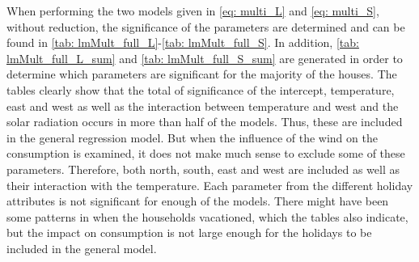 \noindent When performing the two models given in \cref{eq: multi_L} and \cref{eq: multi_S}, without reduction, the significance of the parameters are determined and can be found in \cref{tab: lmMult_full_L}-\ref{tab: lmMult_full_S}. In addition, \cref{tab: lmMult_full_L_sum} and \cref{tab: lmMult_full_S_sum} are generated in order to determine which parameters are significant for the majority of the houses. The tables clearly show that the total of significance of the intercept, temperature, east and west as well as the interaction between temperature and west and the solar radiation occurs in more than half of the models. Thus, these are included in the general regression model. But when the influence of the wind on the consumption is examined, it does not make much sense to exclude some of these parameters. Therefore, both north, south, east and west are included as well as their interaction with the temperature. Each parameter from the different holiday attributes is not significant for enough of the models. There might have been some patterns in when the households vacationed, which the tables also indicate, but the impact on consumption is not large enough for the holidays to be included in the general model. 
\begin{table}
    \centering
\caption{The distribution of significant parameters from the multiple linear regression model for long houses. There are 43 long houses, thus the total of the signifance of each parameter for each house is in relation to the number of long houses}
\label{tab: lmMult_full_L_sum}
\end{table}

